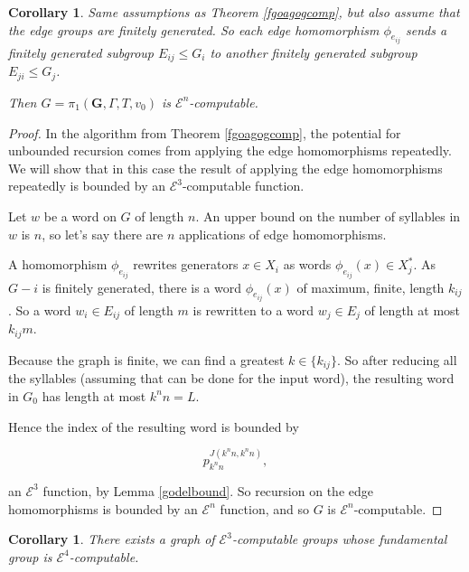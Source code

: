 \documentclass[a4paper]{article}
\newcommand{\grz}[1]{$\mathcal{E}^{#1}$}	%
\theoremstyle{plain}
\newtheorem{corollary}[theorem]{Corollary}
\theoremstyle{definition}
\begin{document}
\begin{corollary}

Same assumptions as Theorem \ref{fgoagogcomp}, but also assume that the edge groups are finitely generated. So each edge homomorphism $\phi_{e_{ij}}$ sends a finitely generated subgroup $E_{ij} \leq G_i$ to another finitely generated subgroup $E_{ji} \leq G_j$.

Then $G = \pi_1(\mathbf{G}, \Gamma, T, v_0)$ is \grz{n}-computable.

\end{corollary}

\begin{proof}

In the algorithm from Theorem \ref{fgoagogcomp}, the potential for unbounded recursion comes from applying the edge homomorphisms repeatedly. We will show that in this case the result of applying the edge homomorphisms repeatedly is bounded by an \grz{3}-computable function.

Let $w$ be a word on $G$ of length $n$. An upper bound on the number of syllables in $w$ is $n$, so let's say there are $n$ applications of edge homomorphisms.

A homomorphism $\phi_{e_{ij}}$ rewrites generators $x \in X_i$ as words $\phi_{e_{ij}}(x) \in X_j^{\ast}$. As $G-i$ is finitely generated, there is a word $\phi_{e_{ij}}(x)$ of maximum, finite, length $k_{ij}$. So a word $w_i \in E_{ij}$ of length $m$ is rewritten to a word $w_j \in E_j$ of length at most $k_{ij}m$.

Because the graph is finite, we can find a greatest $k \in \{k_{ij}\}$. So after reducing all the syllables (assuming that can be done for the input word), the resulting word in $G_0$ has length at most $k^n n = L$.

Hence the index of the resulting word is bounded by

\[ p_{k^nn}^{J(k^nn,k^nn)},\]

an \grz{3} function, by Lemma \ref{godelbound}. So recursion on the edge homomorphisms is bounded by an \grz{n} function, and so $G$ is \grz{n}-computable.

\end{proof}

\begin{corollary}
There exists a graph of \grz{3}-computable groups whose fundamental group is \grz{4}-computable.
\end{corollary}
\end{document}
